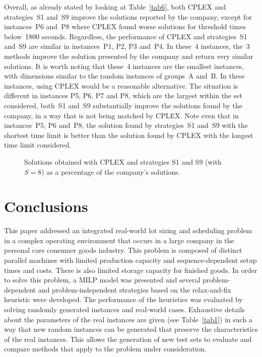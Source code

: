 \documentclass[11pt]{article}
\begin{document}
Overall, as already stated by looking at Table~\ref{tab6}, both CPLEX and strategies~S1 and~S9 improve the solutions reported by the company, except for instances~P6 and~P8 where CPLEX found worse solutions for threshold times below~1800 seconds. Regardless, the performance of CPLEX and strategies~S1 and~S9 are similar in instances~P1, P2, P3 and~P4. In these~4 instances, the~3 methods improve the solution presented by the company and return very similar solutions. It is worth noting that these~4 instances are the smallest instances, with dimensions similar to the random instances of groups~A and~B. In these instances, using CPLEX would be a reasonable alternative. The situation is different in instances P5, P6, P7 and P8, which are the largest within the set considered, both~S1 and~S9 substantially improve the solutions found by the company, in a way that is not being matched by CPLEX. Note even that in instances~P5, P6 and~P8, the solution found by strategies~S1 and~S9 with the shortest time limit is better than the solution found by CPLEX with the longest time limit considered.

\begin{figure}
\centering
\caption{Solutions obtained with CPLEX and strategies S1 and S9 (with $S=8$) as a percentage of the company's solutions.}
\label{fig8}
\end{figure}

\section{Conclusions}

This paper addressed an integrated real-world lot sizing and scheduling problem in a complex operating environment that occurs in a large company in the personal care consumer goods industry. This problem is composed of distinct parallel machines with limited production capacity and sequence-dependent setup times and costs. There is also limited storage capacity for finished goods. In order to solve this problem, a MILP model was presented and several problem-dependent and problem-independent strategies based on the relax-and-fix heuristic were developed. The performance of the heuristics was evaluated by solving randomly generated instances and real-world cases. Exhaustive details about the parameters of the real instances are given (see Table~\ref{tab1}) in such a way that new random instances can be generated that preserve the characteristics of the real instances. This allows the generation of new test sets to evaluate and compare methods that apply to the problem under consideration.
\end{document}
